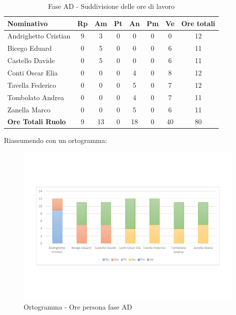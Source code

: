 \documentclass[../PianoProgetto.tex]{subfiles}
\begin{document}
	\begin{table}[h]
		\begin{tabularx}{\textwidth}{l  * {6}{C}  c}
			\toprule
			\textbf{Nominativo} & \textbf{Rp} & \textbf{Am} & \textbf{Pt} 
						& \textbf{An} & \textbf{Pm} & \textbf{Ve} & \textbf{Ore totali} \\
			\midrule
			Andrighetto Cristian & 9 & 3 &	0 &	0 & 0 & 0 & 12 \\
			Bicego Eduard & 0 & 5 & 0 & 0 & 0 & 6 & 11 \\
			Castello Davide & 0 & 5 & 0 & 0 & 0 & 6 & 11 \\
			Conti Oscar Elia & 0 & 0 &	0 &	4 & 0 & 8 & 12 \\
			Tavella Federico &	0 & 0 & 0 & 5 & 0 & 7 & 12 \\
			Tombolato Andrea & 0 & 0 &	0 &	4 & 0 & 7 & 11 \\
			Zanella Marco & 0 & 0 & 0 & 5 & 0 & 6 & 11 \\
			\midrule			
			\textbf{Ore Totali Ruolo} & 9 & 13 & 0 & 18 & 0 & 40 & 80 \\
			\bottomrule
		\end{tabularx}	
		\caption{Fase AD - Suddivisione delle ore di lavoro}
		\label{tab:faseAD_ore}	
	\end{table}
\vfill
\newpage
\vfill
	Riassumendo con un ortogramma:
	
	\begin{figure}[!h]
		\centering
		\includegraphics[width=\textwidth , trim=2cm 5cm 2cm 5cm]{grafici/AD/AD-ore-persona}
			\caption{Ortogramma - Ore persona fase AD}
		\label{fig:BarChart-faseAD_ore}
	\end{figure}
	
\end{document}
